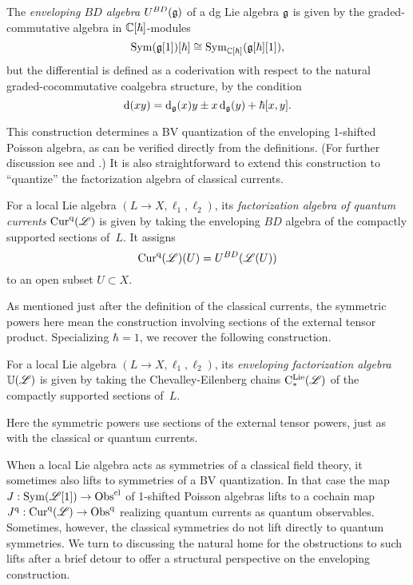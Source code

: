 \begin{dfn}
\label{def: BD envelope}
The {\em enveloping $BD$ algebra} $U^{BD}(\mathfrak g)$ of a dg Lie algebra $\mathfrak g$ is given by the graded-commutative algebra in $\mathbb C[\hbar]$-modules
\[
{\rm Sym}(\mathfrak g[1])[\hbar] \cong {\rm Sym}_{\mathbb C[\hbar]}(\mathfrak g[\hbar][1]),
\]
but the differential is defined as a coderivation with respect to the natural graded-cocommutative coalgebra structure,
by the condition
\[
{\rm d}(xy) = {\rm d}_\mathfrak g(x)y \pm x\, {\rm d}_\mathfrak g(y) + \hbar [x,y].
\]
\end{dfn}

This construction determines a BV quantization of the enveloping 1-shifted Poisson algebra,
as can be verified directly from the definitions.
(For further discussion see \cite{GH} and \cite{CG2}.)
It is also straightforward to extend this construction to ``quantize'' the factorization algebra of classical currents.

\begin{dfn}
For a local Lie algebra $(L\to X, \ell_1,\ell_2)$, 
its {\em factorization algebra of quantum currents} ${\rm Cur}^{\rm q}(\mathscr L)$ is given by taking the enveloping $BD$   algebra of the compactly supported sections of~$L$.
It assigns
\[
{\rm Cur}^{\rm q}(\mathscr L)(U) = U^{BD}(\mathscr L(U))
\]
to an open subset $U \subset X$.
\end{dfn}

As mentioned just after the definition of the classical currents, 
the symmetric powers here mean the construction involving sections of the external tensor product.
Specializing $\hbar = 1$, we recover the following construction.

\begin{dfn}
For a local Lie algebra $(L\to X, \ell_1,\ell_2)$, 
its {\em enveloping factorization algebra} $\mathbb U(\mathscr L)$ is given by taking the Chevalley-Eilenberg chains ${\rm C}^{\rm Lie}_*(\mathscr L)$ of the compactly supported sections of~$L$.
\end{dfn}

Here the symmetric powers use sections of the external tensor powers, just as with the classical or quantum currents.

When a local Lie algebra acts as symmetries of a classical field theory,
it sometimes also lifts to symmetries of a BV quantization.
In that case the map $J: {\rm Sym}(\mathscr L[1]) \to {\rm Obs}^{\rm cl}$ of 1-shifted Poisson algebras lifts to a cochain map $J^{\rm q}: {\rm Cur}^{\rm q}(\mathscr L) \to {\rm Obs}^{\rm q}$ realizing quantum currents as quantum observables.
Sometimes, however, the classical symmetries do not lift directly to quantum symmetries.
We turn to discussing the natural home for the obstructions to such lifts after a brief detour to offer a structural perspective on the enveloping construction.


